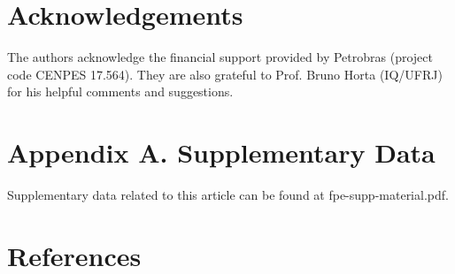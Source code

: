 \documentclass[preprint]{elsarticle}
\begin{document}
	\section*{Acknowledgements}
	
	The authors acknowledge the financial support provided by Petrobras (project code CENPES 17.564). They are also grateful to Prof. Bruno Horta (IQ/UFRJ) for his helpful comments and suggestions.
	
	\section*{Appendix A. Supplementary Data}
	
	Supplementary data related to this article can be found at fpe-supp-material.pdf.
	
	\section*{References}
	
	
	
\end{document}
